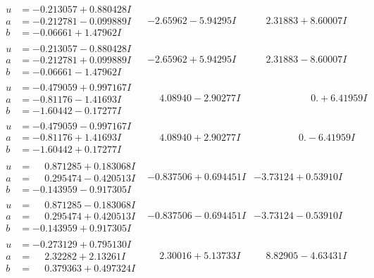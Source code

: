 \documentclass[1p]{elsarticle_modified}
\theoremstyle{definition}
\begin{document}
$$\begin{array}{c|c|c}
\begin{aligned}
u &= -0.213057 + 0.880428 I \\
a &= -0.212781 - 0.099889 I \\
b &= -0.06661 + 1.47962 I\end{aligned}
 & -2.65962 - 5.94295 I & \phantom{-}2.31883 + 8.60007 I \\ \hline\begin{aligned}
u &= -0.213057 - 0.880428 I \\
a &= -0.212781 + 0.099889 I \\
b &= -0.06661 - 1.47962 I\end{aligned}
 & -2.65962 + 5.94295 I & \phantom{-}2.31883 - 8.60007 I \\ \hline\begin{aligned}
u &= -0.479059 + 0.997167 I \\
a &= -0.81176 - 1.41693 I \\
b &= -1.60442 - 0.17277 I\end{aligned}
 & \phantom{-}4.08940 - 2.90277 I & \phantom{-0.000000 -}0. + 6.41959 I \\ \hline\begin{aligned}
u &= -0.479059 - 0.997167 I \\
a &= -0.81176 + 1.41693 I \\
b &= -1.60442 + 0.17277 I\end{aligned}
 & \phantom{-}4.08940 + 2.90277 I & \phantom{-0.000000 } 0. - 6.41959 I \\ \hline\begin{aligned}
u &= \phantom{-}0.871285 + 0.183068 I \\
a &= \phantom{-}0.295474 - 0.420513 I \\
b &= -0.143959 - 0.917305 I\end{aligned}
 & -0.837506 + 0.694451 I & -3.73124 + 0.53910 I \\ \hline\begin{aligned}
u &= \phantom{-}0.871285 - 0.183068 I \\
a &= \phantom{-}0.295474 + 0.420513 I \\
b &= -0.143959 + 0.917305 I\end{aligned}
 & -0.837506 - 0.694451 I & -3.73124 - 0.53910 I \\ \hline\begin{aligned}
u &= -0.273129 + 0.795130 I \\
a &= \phantom{-}2.32282 + 2.13261 I \\
b &= \phantom{-}0.379363 + 0.497324 I\end{aligned}
 & \phantom{-}2.30016 + 5.13733 I & \phantom{-}8.82905 - 4.63431 I \\ \hline\begin{aligned}

\end{aligned}
\end{array}$$
\end{document}
